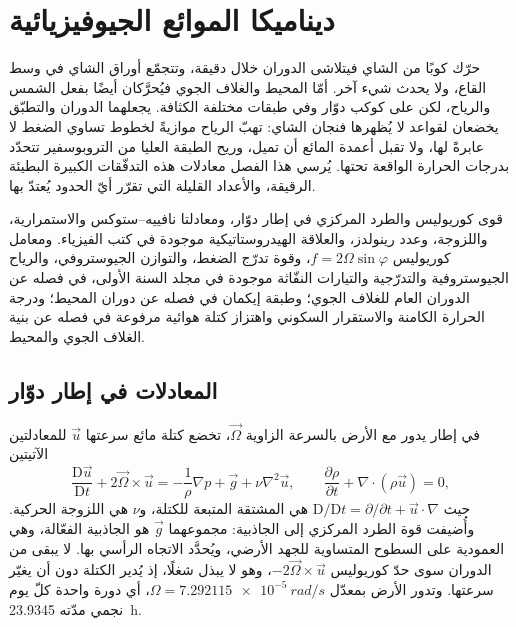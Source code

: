 \chapter{ديناميكا الموائع الجيوفيزيائية}\label{ch:b3:gfd-foundations}

حرّك كوبًا من الشاي فيتلاشى الدوران خلال دقيقة، وتتجمّع أوراق الشاي
في وسط القاع، ولا يحدث شيء آخر. أمّا المحيط والغلاف الجوي
فيُحرَّكان أيضًا بفعل الشمس والرياح، لكن على كوكب دوّار وفي
طبقات مختلفة الكثافة. يجعلهما الدوران والتطبّق يخضعان
لقواعد لا يُظهرها فنجان الشاي: تهبّ الرياح موازيةً لخطوط تساوي الضغط لا عابرةً لها،
ولا تقبل أعمدة المائع أن تميل، وريح الطبقة العليا
من التروبوسفير تتحدّد بدرجات الحرارة الواقعة تحتها. يُرسي هذا الفصل
معادلات هذه التدفّقات الكبيرة البطيئة الرقيقة، والأعداد القليلة
التي تقرّر أيّ الحدود يُعتدّ بها.

\begin{recall}
قوى كوريوليس والطرد المركزي في إطار دوّار، ومعادلتا نافييه--ستوكس
والاستمرارية، واللزوجة، وعدد رينولدز، والعلاقة
الهيدروستاتيكية موجودة في كتب الفيزياء. ومعامل كوريوليس $f = 2\Omega
\sin\varphi$، وقوة تدرّج الضغط، والتوازن الجيوستروفي،
والرياح الجيوستروفية والتدرّجية والتيارات النفّاثة موجودة في مجلد
السنة الأولى، في فصله عن الدوران العام للغلاف الجوي؛ وطبقة إيكمان
في فصله عن دوران المحيط؛ ودرجة الحرارة الكامنة
والاستقرار السكوني واهتزاز كتلة هوائية مرفوعة في فصله عن بنية
الغلاف الجوي والمحيط.
\end{recall}

\section{المعادلات في إطار دوّار}\label{sec:b3:gfd-foundations:equations}

في إطار يدور مع الأرض بالسرعة الزاوية
$\vec\Omega$، تخضع كتلة مائع سرعتها $\vec u$ للمعادلتين الآتيتين
\[
\frac{\mathrm D\vec u}{\mathrm Dt} + 2\vec\Omega\times\vec u =
-\frac{1}{\rho}\nabla p + \vec g + \nu\nabla^2\vec u ,
\qquad
\frac{\partial\rho}{\partial t} + \nabla\cdot(\rho\vec u) = 0 ,
\]
حيث $\mathrm D/\mathrm Dt = \partial/\partial t + \vec u\cdot\nabla$ هي
المشتقة المتبعة للكتلة، و$\nu$ هي اللزوجة الحركية. وأُضيفت قوة الطرد المركزي إلى
الجاذبية: مجموعهما $\vec g$ هو الجاذبية الفعّالة، وهي
العمودية على السطوح المتساوية للجهد الأرضي،
ويُحدَّد الاتجاه الرأسي بها. لا يبقى من الدوران سوى حدّ كوريوليس $-2\vec\Omega\times
\vec u$، وهو لا يبذل شغلًا، إذ يُدير الكتلة
دون أن يغيّر سرعتها. وتدور الأرض بمعدّل $\Omega =
\qty{7.292115e-5}{rad/s}$، أي دورة واحدة كلّ يوم نجمي مدّته \qty{23.9345}{h}.

